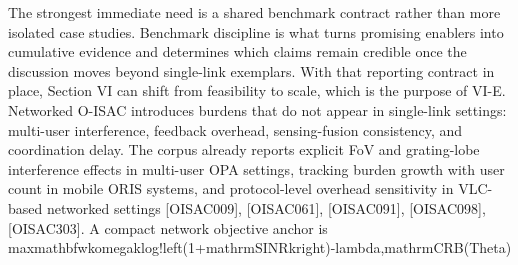 {}\markdownRendererParagraphSeparator
{} The strongest immediate need is a shared benchmark contract rather than more isolated case studies. Benchmark discipline is what turns promising enablers into cumulative evidence and determines which claims remain credible once the discussion moves beyond single-link exemplars. With that reporting contract in place, Section VI can shift from feasibility to scale, which is the purpose of VI-E.\markdownRendererInterblockSeparator
{}
\markdownRendererSectionEnd \markdownRendererSectionBegin
{}\markdownRendererInterblockSeparator
{}Networked O-ISAC introduces burdens that do not appear in single-link settings: multi-user interference, feedback overhead, sensing-fusion consistency, and coordination delay. The corpus already reports explicit FoV and grating-lobe interference effects in multi-user OPA settings, tracking burden growth with user count in mobile ORIS systems, and protocol-level overhead sensitivity in VLC-based networked settings [O\markdownRendererUnderscore{}ISAC\markdownRendererUnderscore{}009], [O\markdownRendererUnderscore{}ISAC\markdownRendererUnderscore{}061], [O\markdownRendererUnderscore{}ISAC\markdownRendererUnderscore{}091], [O\markdownRendererUnderscore{}ISAC\markdownRendererUnderscore{}098], [O\markdownRendererUnderscore{}ISAC\markdownRendererUnderscore{}303].\markdownRendererParagraphSeparator
{}A compact network objective anchor is\markdownRendererParagraphSeparator
{}\markdownRendererDollarSign{}\markdownRendererDollarSign{}\markdownRendererSoftLineBreak
{}\markdownRendererBackslash{}max\markdownRendererUnderscore{}\markdownRendererLeftBrace{}\markdownRendererLeftBrace{}\markdownRendererBackslash{}mathbf\markdownRendererLeftBrace{}w\markdownRendererRightBrace{}\markdownRendererLeftBrace{}k\markdownRendererRightBrace{}\markdownRendererBackslash{}omega\markdownRendererUnderscore{}k\markdownRendererBackslash{}log!\markdownRendererBackslash{}left(1+\markdownRendererBackslash{}mathrm\markdownRendererLeftBrace{}SINR\markdownRendererRightBrace{}\markdownRendererUnderscore{}k\markdownRendererBackslash{}right)-\markdownRendererBackslash{}lambda,\markdownRendererBackslash{}mathrm\markdownRendererLeftBrace{}CRB\markdownRendererRightBrace{}(\markdownRendererBackslash{}Theta)\markdownRendererSoftLineBreak
